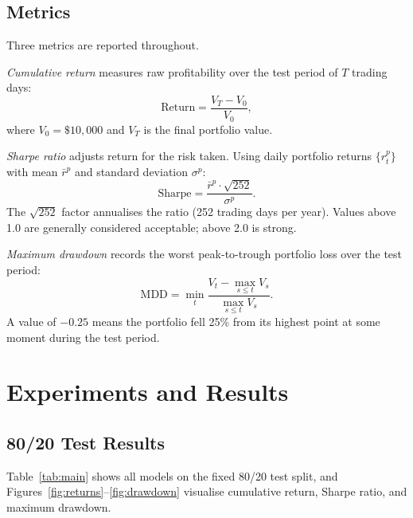 \documentclass[letterpaper,twocolumn]{article}
\begin{document}
\subsection{Metrics}

Three metrics are reported throughout.

\noindent\textit{Cumulative return} measures raw profitability
over the test period of $T$ trading days:
\begin{equation}
  \text{Return} = \frac{V_T - V_0}{V_0},
\end{equation}
where $V_0 = \$10{,}000$ and $V_T$ is the final portfolio value.

\noindent\textit{Sharpe ratio} \citep{sharpe1994sharpe} adjusts
return for the risk taken. Using daily portfolio returns
$\{r^p_t\}$ with mean $\bar{r}^p$ and standard deviation
$\sigma^p$:
\begin{equation}
  \text{Sharpe} = \frac{\bar{r}^p \cdot \sqrt{252}}{\sigma^p}.
\end{equation}
The $\sqrt{252}$ factor annualises the ratio (252 trading days
per year). Values above 1.0 are generally considered
acceptable; above 2.0 is strong.

\noindent\textit{Maximum drawdown} records the worst
peak-to-trough portfolio loss over the test period:
\begin{equation}
  \text{MDD} = \min_{t} \frac{V_t - \max_{s \leq t} V_s}{\max_{s \leq t} V_s}.
\end{equation}
A value of $-0.25$ means the portfolio fell 25\% from its
highest point at some moment during the test period.

\section{Experiments and Results}

\subsection{80/20 Test Results}

Table~\ref{tab:main} shows all models on the fixed 80/20 test
split, and Figures~\ref{fig:returns}--\ref{fig:drawdown}
visualise cumulative return, Sharpe ratio, and maximum
drawdown.
\end{document}

